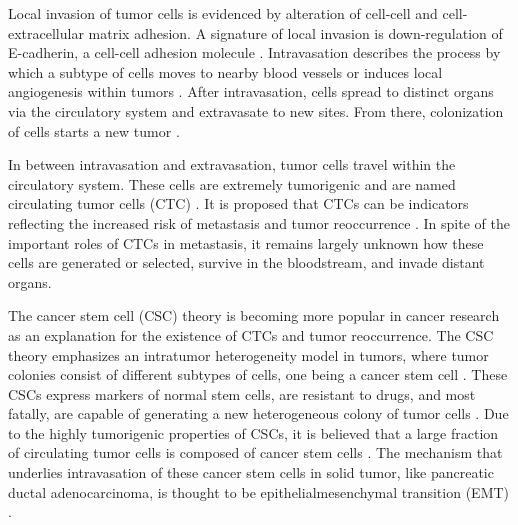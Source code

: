 \documentclass[11pts]{article}
\begin{document}
\noindent Local invasion of tumor cells is evidenced by alteration of cell-cell and cell-extracellular matrix adhesion. A signature of local invasion is down-regulation of E-cadherin, a cell-cell adhesion molecule \cite{Hanahan2011646}. Intravasation describes the process by which a subtype of cells moves to nearby blood vessels or induces local angiogenesis within tumors \cite{Reymond:2013rw}. After intravasation, cells spread to distinct organs via the circulatory system and extravasate to new sites. From there, colonization of cells starts a new tumor \cite{Nguyen:2009qq}. 
\newline

\newline
\noindent In between intravasation and extravasation, tumor cells travel within the circulatory system. These cells are extremely tumorigenic and are named circulating tumor cells (CTC) \cite{Alix-Panabieres:2014la}. It is proposed that CTCs can be indicators reflecting the increased risk of metastasis and tumor reoccurrence \cite{Noman:2014qf}. In spite of the important roles of CTCs in metastasis, it remains largely unknown how these cells are generated or selected, survive in the bloodstream, and invade distant organs.
  \newline

\noindent The cancer stem cell (CSC) theory is becoming more popular in cancer research as an explanation for the existence of CTCs and tumor reoccurrence. The CSC theory emphasizes an intratumor heterogeneity model in tumors, where tumor colonies consist of different subtypes of cells, one being a cancer stem cell \cite{Hanahan2011646}. These CSCs express markers of normal stem cells, are resistant to drugs, and most fatally, are capable of generating a new heterogeneous colony of tumor cells \cite{Hanahan2011646}. Due to the highly tumorigenic properties of CSCs, it is believed that a large fraction of circulating tumor cells is composed of cancer stem cells \cite{Noman:2014qf}. The mechanism that underlies intravasation of these cancer stem cells in solid tumor, like pancreatic ductal adenocarcinoma, is thought to be epithelial\textendash mesenchymal transition (EMT) \cite{Karamitopoulou:2012zr}. 
 \newline
\end{document}
